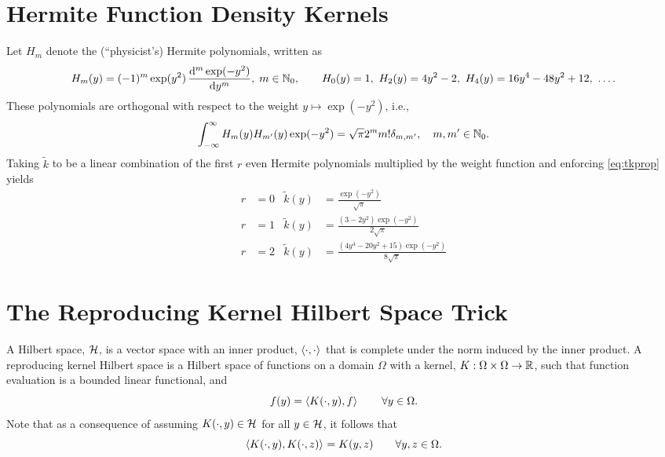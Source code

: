 \documentclass[letterpaper]{amsart}
\newcommand{\tk}{\tilde{k}}
\begin{document}
\section{Hermite Function Density Kernels}

Let $H_m$ denote the (``physicist's) Hermite polynomials, written as
\begin{equation*}
	H_m(y) = (-1)^m \exp(y^2) \, \frac{\dif^m \exp(-y^2)}{\dif y^m}, \; m \in \natzero, \qquad
	H_0(y) = 1, \ H_2(y) = 4y^2-2, \ H_4(y) = 16 y^4 - 48 y^2 + 12, \ \ldots.
\end{equation*}
These polynomials are orthogonal with respect to the weight $y \mapsto \exp(-y^2)$, i.e.,
\begin{equation*}
	\int_{-\infty}^{\infty} H_m(y) H_{m'}(y) \exp(-y^2) = \sqrt{\pi} 2^m m! \delta_{m,m'}, \quad m,m' \in \mathbb{N}_{0}.
\end{equation*}
Taking $\tk$ to be a linear combination of the first $r$ even Hermite polynomials multiplied by the weight function and enforcing \eqref{eq:tkprop} yields
\begin{align*}
	r& = 0  & \tk(y) &= \frac{\exp(-y^2)}{\sqrt{\pi}}
		\\
	r& = 1 &  \tk(y) & =\frac{\left(3 - 2y^{2}\right) \exp(- y^{2})}{2\sqrt{\pi}} \\
	r &= 2 & \tk(y) & = \frac{\left(4 y^{4} - 20 y^{2} + 15\right) \exp(- y^{2})}{8 \sqrt{\pi}}
\end{align*}




\appendix

\section{The Reproducing Kernel Hilbert Space Trick} \label{app:rkhs}
A Hilbert space, $\mathcal{H}$, is a vector space with an inner product, $\left \langle \cdot, \cdot \right \rangle_{{}}$ that is complete under the norm induced by the inner product.  A reproducing kernel Hilbert space \cite{RKHSwiki} is a Hilbert space of functions on a domain $\Omega$ with a kernel, $K:\Omega \times \Omega \to \mathbb{R}$, such that function evaluation is a bounded linear functional, and
\begin{equation} \label{eq:repproperty}
    f(y) = \left \langle K(\cdot,y), f \right \rangle_{{}} \qquad \forall y \in \Omega.
\end{equation}
Note that as a consequence of assuming $K(\cdot,y) \in \mathcal{H}$ for all $y\in \mathcal{H}$, it follows that
\begin{equation} \label{eq:rkip}
    \left \langle K(\cdot,y), K(\cdot, z) \right \rangle_{{}} = K(y,z) \qquad \forall y,z \in \Omega.
\end{equation}
\end{document}
